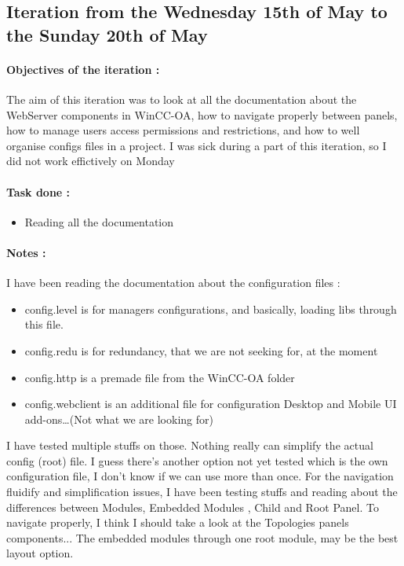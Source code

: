 \documentclass[a4paper, 10pt]{article}
\begin{document}
\subsection{Iteration from the Wednesday 15th of May to the Sunday 20th of May}
\paragraph{Objectives of the iteration :}
The aim of this iteration was to look at all the documentation about the WebServer components in WinCC-OA, how to navigate properly between panels, how to manage users access permissions and restrictions, and how to well organise configs files in a project. I was sick during a part of this iteration, so I did not work effictively on Monday
\paragraph{Task done :}
\begin{itemize}
    \item Reading all the documentation
\end{itemize}

\paragraph{Notes :} 
I have been reading the documentation about the configuration files :
\begin{itemize}
    \item config.level is for managers configurations, and basically, loading libs through this file.
    \item config.redu is for redundancy, that we are not seeking for, at the moment
    \item config.http is a premade file from the WinCC-OA folder
    \item config.webclient is an additional file for configuration Desktop and Mobile UI add-ons\dots (Not what we are looking for)
\end{itemize}
I have tested multiple stuffs on those. Nothing really can simplify the actual config (root) file.
I guess there's another option not yet tested which is the own configuration file, I don't know if we can use more than once.\newline
For the navigation fluidify and simplification issues, I have been testing stuffs and reading about the differences between Modules, Embedded Modules , Child and Root Panel.\newline
To navigate properly, I think I should take a look at the Topologies panels components... The embedded modules through one root module, may be the best layout option.
\end{document}
